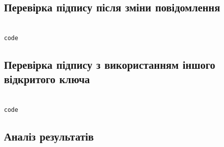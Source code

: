 \subsection{Перевірка підпису після зміни повідомлення}


\begin{lstlisting}[language=Python]

code

\end{lstlisting}



\subsection{Перевірка підпису з використанням іншого відкритого ключа}


\begin{lstlisting}[language=Python]

code

\end{lstlisting}



\subsection{Аналіз результатів}
